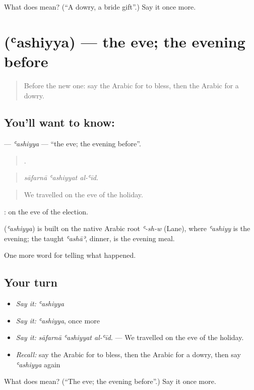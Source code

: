 \begin{tcolorbox}[breakable,colback=teal!4,colframe=teal!35!black,title={Before you move on}]
What does  mean? (\textquotedblleft{}A dowry, a bride gift\textquotedblright{}.) Say it once more.
\end{tcolorbox}
\section[\texorpdfstring{\ar{عشية} (ʿashiyya)}{عشية (ʿashiyya)}]{ (ʿashiyya) — the eve; the evening before}

\label{lesson:AR-C336-ashiyya}



\begin{quote}
Before the new one: say the Arabic for to bless, then the Arabic for a dowry.
\end{quote}

\subsection*{You'll want to know: }
\textbf{} — \emph{ʿashiyya} — \textquotedblleft{}the eve; the evening before\textquotedblright{}.

\begin{quote}
  .
\end{quote}

\begin{quote}
\emph{sāfarnā ʿashiyyat al-ʿīd.}
\end{quote}

\begin{quote}
We travelled on the eve of the holiday.
\end{quote}

 : on the eve of the election.

\begin{cousinweb}
\textbf{} (\emph{ʿashiyya}) is built on the native Arabic root \emph{ʿ-sh-w} (Lane), where \emph{ʿashiyy} is the evening; the taught \emph{ʿashāʾ}, dinner, is the evening meal.
\end{cousinweb}

\begin{grammarlens}[title={What you've built}]
One more word for telling what happened.
\end{grammarlens}

\subsection*{Your turn}
\begin{itemize}
\raggedright
  \item \emph{Say it:} \emph{ʿashiyya}
  \item \emph{Say it:} \emph{ʿashiyya}, once more
  \item \emph{Say it:} \emph{sāfarnā ʿashiyyat al-ʿīd.} — We travelled on the eve of the holiday.
  \item \emph{Recall:} say the Arabic for to bless, then the Arabic for a dowry, then say \emph{ʿashiyya} again
\end{itemize}

\begin{tcolorbox}[breakable,colback=teal!4,colframe=teal!35!black,title={Before you move on}]
What does  mean? (\textquotedblleft{}The eve; the evening before\textquotedblright{}.) Say it once more.
\end{tcolorbox}
